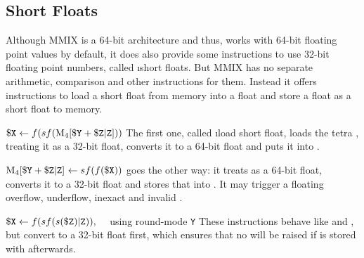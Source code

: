 \subsection{Short Floats}

Although MMIX is a 64-bit architecture and thus, works with 64-bit floating point values by default, it does also provide some instructions to use 32-bit floating point numbers, called \i{short floats}. But MMIX has no separate arithmetic, comparison and other instructions for them. Instead it offers instructions to load a short float from memory into a float and store a float as a short float to memory.

\instrtbl
	{}
	{$\dr{X} \leftarrow f(sf(\vmem{4}{\dr{Y} + \udrim{Z}}))$}
\noindent The first one, called \i{load short float}, loads the tetra , treating it as a 32-bit float, converts it to a 64-bit float and puts it into . \citep[pg. 20]{mmix-doc}

\instrtbl
	{}
	{$\vmem{4}{\dr{Y} + \udrim{Z}}~\leftarrow sf(f(\dr{X}))$}
\noindent {} goes the other way: it treats  as a 64-bit float, converts it to a 32-bit float and stores that into . It may trigger a floating overflow, underflow, inexact and invalid . \citep[pg. 20]{mmix-doc}

\instrtbl
	{}
	{${\tt \$X} \leftarrow f(sf(s({\tt \$Z}){\tt|Z})),\quad$ using round-mode {\tt Y}}
\noindent These instructions behave like  and , but convert  to a 32-bit float first, which ensures that no  will be raised if  is stored with  afterwards. \citep[pg. 20]{mmix-doc}



